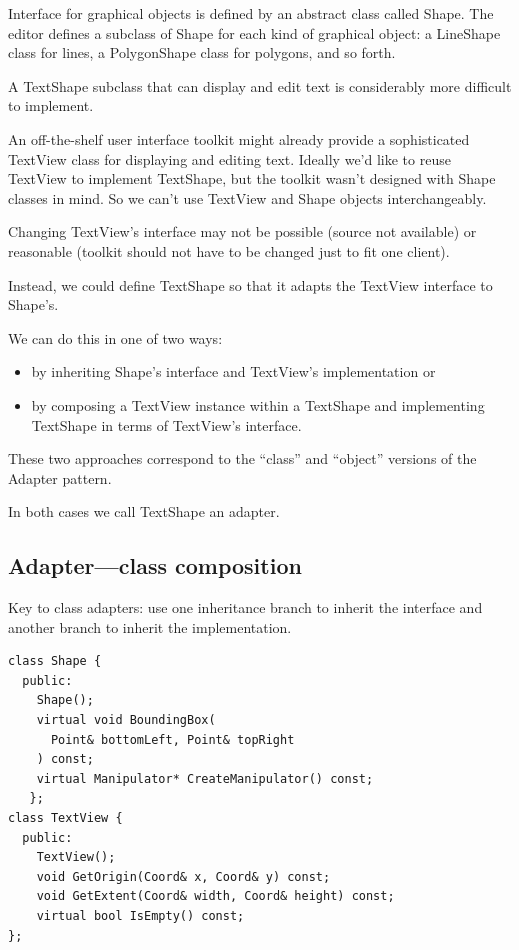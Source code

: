 \documentclass[11pt]{report}
\begin{document}
Interface for graphical objects is defined by an abstract class called Shape. 
The editor defines a subclass of Shape for each kind of graphical object: 
a LineShape class for lines, a PolygonShape class for polygons, and so forth.

A TextShape subclass that can display and edit text is considerably more difficult to implement.

An off-the-shelf user interface toolkit might already provide a sophisticated TextView 
class for displaying and editing text. 
Ideally we'd like to reuse TextView to implement TextShape, but the toolkit wasn't 
designed with Shape classes in mind. So we can't use TextView and Shape objects interchangeably.

Changing TextView's interface may not be possible (source not available) or reasonable (toolkit should
not have to be changed just to fit one client).

Instead, we could define TextShape so that it adapts the TextView interface to Shape's. 

We can do this in one of two ways: 
\begin{itemize}
\item by inheriting Shape's interface and TextView's implementation or 
\item by composing a TextView instance within a TextShape and implementing TextShape in terms of TextView's interface. 
\end{itemize}
These two approaches correspond to the ``class'' and ``object'' versions of the Adapter pattern. 

In both cases we call TextShape an adapter.

\subsection{Adapter---class composition}

Key to class adapters:  use one inheritance branch to inherit the 
interface and another branch to inherit the implementation. 
\begin{lstlisting}
class Shape {
  public:
    Shape();
    virtual void BoundingBox(
      Point& bottomLeft, Point& topRight
    ) const;
    virtual Manipulator* CreateManipulator() const;
   };
class TextView {
  public:
    TextView();
    void GetOrigin(Coord& x, Coord& y) const;
    void GetExtent(Coord& width, Coord& height) const;
    virtual bool IsEmpty() const;
};
\end{lstlisting}
\end{document}
